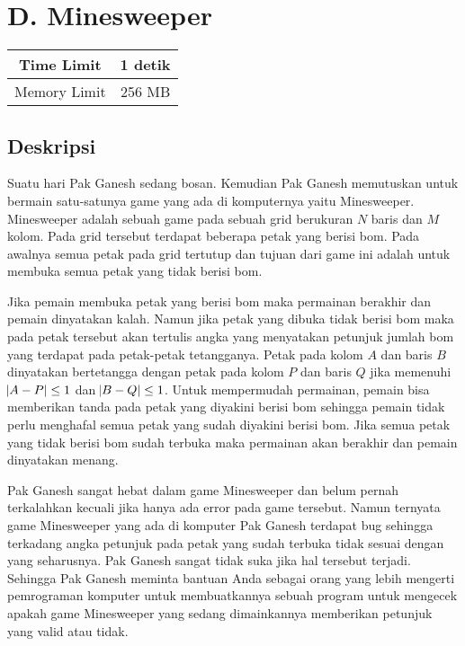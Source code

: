 \documentclass{article}
\begin{document}
\section*{\hfil D. Minesweeper\hfil}

\begin{center}
\begin{tabular}{ |cc| } 
 \hline
 Time Limit & 1 detik \\ 
 \hline
 Memory Limit & 256 MB \\
 \hline
\end{tabular}
\end{center}

\subsection*{Deskripsi}

\par\noindent
Suatu hari Pak Ganesh sedang bosan. Kemudian Pak Ganesh memutuskan untuk bermain satu-satunya game yang ada di komputernya yaitu Minesweeper. Minesweeper adalah sebuah game pada sebuah grid berukuran $N$ baris dan $M$ kolom. Pada grid tersebut terdapat beberapa petak yang berisi bom. Pada awalnya semua petak pada grid tertutup dan tujuan dari game ini adalah untuk membuka semua petak yang tidak berisi bom.
\newline
\par\noindent
Jika pemain membuka petak yang berisi bom maka permainan berakhir dan pemain dinyatakan kalah. Namun jika petak yang dibuka tidak berisi bom maka pada petak tersebut akan tertulis angka yang menyatakan petunjuk jumlah bom yang terdapat pada petak-petak tetangganya. Petak pada kolom $A$ dan baris $B$ dinyatakan bertetangga dengan petak pada kolom $P$ dan baris $Q$ jika memenuhi $\abs{A-P}\leq 1$ dan $\abs{B-Q} \leq 1$. Untuk mempermudah permainan, pemain bisa memberikan tanda pada petak yang diyakini berisi bom sehingga pemain tidak perlu menghafal semua petak yang sudah diyakini berisi bom. Jika semua petak yang tidak berisi bom sudah terbuka maka permainan akan berakhir dan pemain dinyatakan menang.
\newline
\par\noindent
Pak Ganesh sangat hebat dalam game Minesweeper dan belum pernah terkalahkan kecuali jika hanya ada error pada game tersebut. Namun ternyata game Minesweeper yang ada di komputer Pak Ganesh terdapat bug sehingga terkadang angka petunjuk pada petak yang sudah terbuka tidak sesuai dengan yang seharusnya. Pak Ganesh sangat tidak suka jika hal tersebut terjadi. Sehingga Pak Ganesh meminta bantuan Anda sebagai orang yang lebih mengerti pemrograman komputer untuk membuatkannya sebuah program untuk mengecek apakah game Minesweeper yang sedang dimainkannya memberikan petunjuk yang valid atau tidak.
\end{document}

